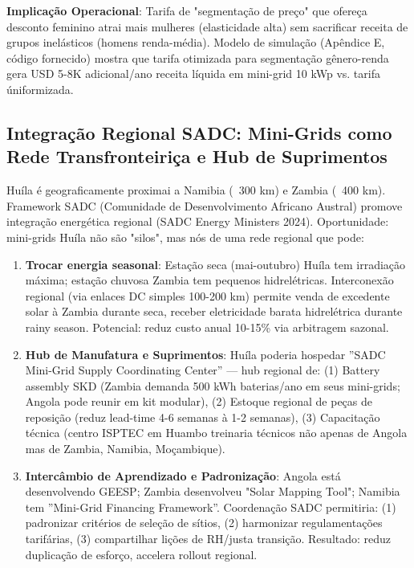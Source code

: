 \documentclass[12pt, a4paper]{article}
\begin{document}
\textbf{Implicação Operacional}: Tarifa de "segmentação de preço" que ofereça desconto feminino atrai mais mulheres (elasticidade alta) sem sacrificar receita de grupos inelásticos (homens renda-média). Modelo de simulação (Apêndice E, código fornecido) mostra que tarifa otimizada para segmentação gênero-renda gera USD 5-8K adicional/ano receita líquida em mini-grid 10 kWp vs. tarifa úniformizada.

\subsection{Integração Regional SADC: Mini-Grids como Rede Transfronteiriça e Hub de Suprimentos}

Huíla é geograficamente proximai a Namibia (~300 km) e Zambia (~400 km). Framework SADC (Comunidade de Desenvolvimento Africano Austral) promove integração energética regional (SADC Energy Ministers 2024). Oportunidade: mini-grids Huíla não são "silos", mas nós de uma rede regional que pode:
\begin{enumerate}
\item \textbf{Trocar energia seasonal}: Estação seca (mai-outubro) Huíla tem irradiação máxima; estação chuvosa Zambia tem pequenos hidrelétricas. Interconexão regional (via enlaces DC simples 100-200 km) permite venda de excedente solar à Zambia durante seca, receber eletricidade barata hidrelétrica durante rainy season. Potencial: reduz custo anual 10-15\% via arbitragem sazonal.

\item \textbf{Hub de Manufatura e Suprimentos}: Huíla poderia hospedar ''SADC Mini-Grid Supply Coordinating Center'' — hub regional de: (1) Battery assembly SKD (Zambia demanda 500 kWh baterias/ano em seus mini-grids; Angola pode reunir em kit modular), (2) Estoque regional de peças de reposição (reduz lead-time 4-6 semanas à 1-2 semanas), (3) Capacitação técnica (centro ISPTEC em Huambo treinaria técnicos não apenas de Angola mas de Zambia, Namibia, Moçambique).

\item \textbf{Intercâmbio de Aprendizado e Padronização}: Angola está desenvolvendo GEESP; Zambia desenvolveu "Solar Mapping Tool"; Namibia tem ''Mini-Grid Financing Framework''. Coordenação SADC permitiria: (1) padronizar critérios de seleção de sítios, (2) harmonizar regulamentações tarifárias, (3) compartilhar lições de RH/justa transição. Resultado: reduz duplicação de esforço, accelera rollout regional.
\end{enumerate}
\end{document}
